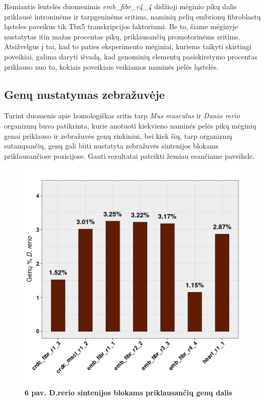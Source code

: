 \documentclass[12pt]{article}
\begin{document}
Remiantis lentelės duomenimis \emph{emb\_fibr\_r4\_4} didžioji mėginio pikų
dalis priklausė introninėms ir tarpgeninėms sritims, naminių pelių embrionų
fibroblastų ląsteles paveikus tik Tbx5 transkripcijos faktoriumi. Be to, šiame
mėginyje nustatytas itin mažas procentas pikų, priklausančių promotorinėms
sritims. Atsižvelgus į tai, kad to paties eksperimento mėginiai, kuriems taikyti
skirtingi poveikiai, galima daryti išvadą, kad genominių elementų pasiskirstymo
procentas priklauso nuo to, kokiais poveikiais veikiamos naminės pelės ląstelės.

\newpage

\subsection{Genų nustatymas zebražuvėje}
Turint duomenis apie homologiškas sritis tarp \emph{Mus musculus} ir
\emph{Danio rerio} organizmų buvo patikrinta, kurie anotuoti kiekvieno naminės
pelės pikų mėginių genai priklauso ir zebražuvės genų rinkiniui, bei kiek šių,
tarp organizmų sutampančių, genų gali būti nustatyta zebražuvės sintenijos
blokams priklausančiose pozicijose. Gauti rezultatai pateikti žemiau esančiame
paveiksle.

\begin{figure}[htb]
    \begin{center}
        \includegraphics[width=0.7\linewidth]{../Figures/Unique_genes_DR.png}
        \vspace{-2\baselineskip}
        \caption*{\small\textbf{6 pav. D.rerio sintenijos blokams priklausančių
        genų dalis}}
        \label{fig:birds}
    \end{center}
\end{figure}
\end{document}

